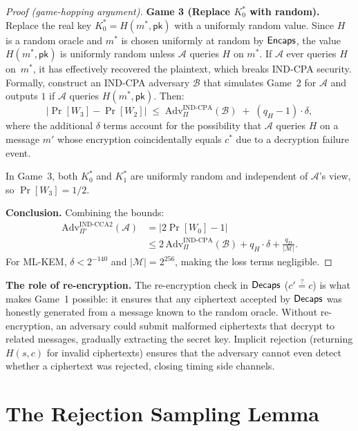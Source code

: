 \begin{proof}[Proof (game-hopping argument)]
\medskip\noindent\textbf{Game 3 (Replace $K_0^*$ with
random).}
Replace the real key
$K_0^* = H(m^*, \mathsf{pk})$ with a uniformly random value.
Since $H$ is a random oracle and $m^*$ is chosen uniformly at
random by $\mathsf{Encaps}$, the value $H(m^*, \mathsf{pk})$ is
uniformly random unless $\mathcal{A}$ queries $H$ on $m^*$.
If $\mathcal{A}$ ever queries $H$ on~$m^*$, it has
effectively recovered the plaintext, which breaks IND-CPA
security.  Formally, construct an IND-CPA adversary
$\mathcal{B}$ that simulates Game~2 for $\mathcal{A}$ and
outputs $1$ if $\mathcal{A}$ queries $H(m^*, \mathsf{pk})$.
Then:
\begin{equation}
|\Pr[W_3] - \Pr[W_2]| \;\leq\;
  \mathrm{Adv}^{\mathrm{IND\text{-}CPA}}_{\Pi}(\mathcal{B})
  \;+\; (q_H - 1)\cdot\delta,
\end{equation}
where the additional $\delta$ terms account for the possibility
that $\mathcal{A}$ queries $H$ on a message $m'$ whose
encryption coincidentally equals $c^*$ due to a decryption
failure event.

In Game~3, both $K_0^*$ and $K_1^*$ are uniformly random and
independent of $\mathcal{A}$'s view, so
$\Pr[W_3] = 1/2$.

\medskip\noindent\textbf{Conclusion.}
Combining the bounds:
\begin{align}
\mathrm{Adv}^{\mathrm{IND\text{-}CCA2}}_{\Pi'}(\mathcal{A})
&= |2\Pr[W_0] - 1| \\
&\leq 2\,\mathrm{Adv}^{\mathrm{IND\text{-}CPA}}_{\Pi}(\mathcal{B})
  + q_H\cdot\delta + \frac{q_D}{|\mathcal{M}|}.
\end{align}
For ML-KEM, $\delta < 2^{-140}$ and $|\mathcal{M}| = 2^{256}$,
making the loss terms negligible.
\end{proof}

\noindent\textbf{The role of re-encryption.}
The re-encryption check in $\mathsf{Decaps}$ ($c' \stackrel{?}{=} c$) is
what makes Game~1 possible: it ensures that any ciphertext
accepted by $\mathsf{Decaps}$ was honestly generated from a message
known to the random oracle.  Without re-encryption, an
adversary could submit malformed ciphertexts that decrypt to
related messages, gradually extracting the secret key.
Implicit rejection (returning $H(s, c)$ for invalid ciphertexts)
ensures that the adversary cannot even detect whether a
ciphertext was rejected, closing timing side channels.


\section{The Rejection Sampling Lemma}
\label{app:rejection-sampling}

